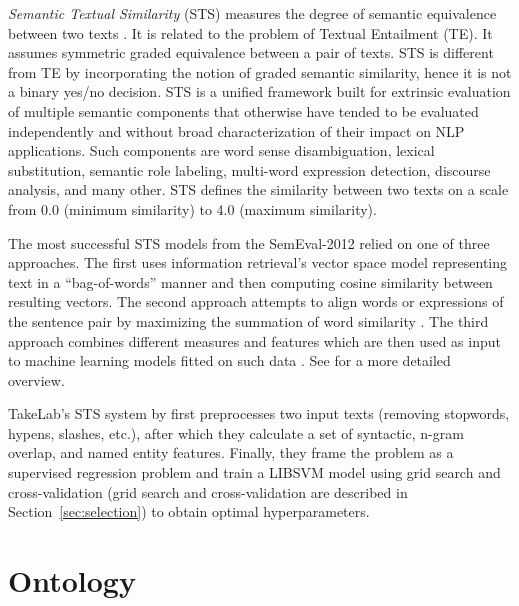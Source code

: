 \textit{Semantic  Textual  Similarity} (STS) measures the  degree  of  semantic
equivalence  between two texts \citep{agirre2012semeval}. It is related to the problem
of Textual Entailment (TE). It assumes symmetric graded equivalence between
a pair of texts. STS is different from TE by incorporating the notion of 
graded semantic similarity, hence it is not a binary yes/no decision. 
STS is a unified framework built for 
extrinsic evaluation of multiple semantic components that otherwise
have tended to be evaluated independently  and  without  broad
characterization  of their impact on NLP applications. 
Such components are word  sense  disambiguation, lexical  substitution,  semantic
role  labeling,  multi-word  expression  detection, discourse analysis, and 
many other. STS defines the similarity between two texts on a scale from 
0.0 (minimum similarity) to 4.0 (maximum similarity).

The most successful STS models from the SemEval-2012 relied on 
one of three approaches. The first uses information retrieval's 
vector space model \citep{meadow1992text} representing text in a 
``bag-of-words'' manner and then computing cosine similarity between 
resulting vectors. The second approach attempts to align words or expressions of
the sentence pair by maximizing the summation of word similarity \citep{mihalcea2006corpus}.
The third approach combines different measures and features which are then 
used as input to machine learning models fitted on such data 
\citep{vsaric2012takelab}. See \citep{han2013umbc_ebiquity}
for a more detailed overview. 

TakeLab's STS system by \citet{vsaric2012takelab} first preprocesses two input
texts (removing stopwords, hypens, slashes, etc.), after which they calculate
a set of syntactic, n-gram overlap, and named entity features.  Finally, they
frame the problem as a supervised regression problem and train a LIBSVM model
\citep{chang2011libsvm} using grid search and cross-validation (grid search and
cross-validation are described in
Section~\ref{sec:selection}) to obtain optimal hyperparameters.

\section{Ontology}
\label{sec:knowledge_representation}

